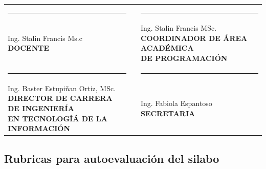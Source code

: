 \documentclass[a4paper,12pt,spanish]{article}
\begin{document}
\vspace{0.3cm}
\begin{center}
\begin{tabular}[H]{lll}
  \rule{5cm}{0.4pt}&  &\rule{5cm}{0.4pt} \\
  \makecell[l]{Ing. Stalin Francis Ms.c\\\textbf{ DOCENTE}}  & &\makecell[l]{Ing. Stalin Francis MSc. \\ \textbf{COORDINADOR DE ÁREA ACADÉMICA} \\ \textbf{DE PROGRAMACIÓN}} \\ 


  \rule{7cm}{0.4pt}&  &\rule{5cm}{0.4pt} \\
  \makecell[l]{Ing. Baster Estupiñan Ortiz, MSc. \\ \textbf{DIRECTOR DE CARRERA DE INGENIERÍA} \\ \textbf{EN TECNOLOGÍÁ DE LA INFORMACIÓN}} & & \makecell[l]{Ing. Fabiola Espantoso \\ \textbf{SECRETARIA}} 
\end{tabular}
\end{center}





\subsection{Rubricas para autoevaluación del silabo}
\label{sec:rubr-para-aprob}
\end{document}
